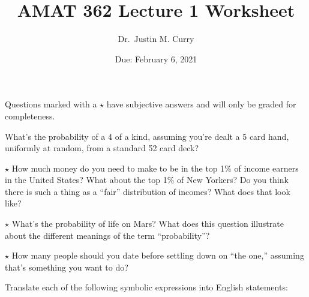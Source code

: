 \documentclass[addpoints,12pt]{exam}
\title{\vspace{-1in} AMAT 362 Lecture 1 Worksheet}
\date{Due: February 6, 2021}
\author{Dr.~Justin M. Curry}
\begin{document}
\maketitle



Questions marked with a $\star$ have subjective answers and will only be graded for completeness.

\begin{questions}

\question[2] What's the probability of a 4 of a kind, assuming you're dealt a 5 card hand, uniformly at random, from a standard 52 card deck?


\question[1] $\star$ How much money do you need to make to be in the top 1\% of income earners in the United States? What about the top 1\% of New Yorkers? Do you think there is such a thing as a ``fair'' distribution of incomes? What does that look like?


\question[1] $\star$ What's the probability of life on Mars? What does this question illustrate about the different meanings of the term ``probability''?

%
\question[1] $\star$ How many people should you date before settling down on ``the one,'' assuming that's something you want to do?


\question[6] Translate each of the following symbolic expressions into English statements:

\noaddpoints
{}
\end{questions}
\end{document}
